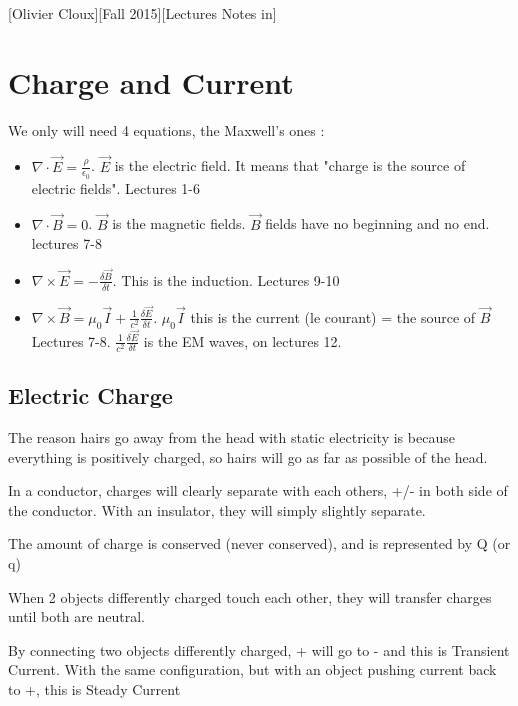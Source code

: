 \documentclass[12pt,a4paper]{article}
\begin{document}
[Olivier Cloux][Fall 2015][Lectures Notes in]
\tableofcontents
{}
\section{Charge and Current}
We only will need 4 equations, the Maxwell's ones :
\begin{itemize}
	\item 	$\nabla \cdot \vec{E} = \frac{\rho}{\epsilon_0}$. $\vec{E}$ is the electric field. It means that "charge is the source of electric fields". Lectures 1-6
	\item	$\nabla \cdot \vec{B} = 0$. $\vec{B}$ is the magnetic fields. $\vec{B}$ fields have no beginning and no end. lectures 7-8
	\item $\nabla \times \vec{E} = -\frac{\delta \vec{B}}{\delta t}$. This is the induction. Lectures 9-10
	\item $\nabla \times \vec{B} = \mu_0 \vec{I} + \frac{1}{c^2}\frac{\delta\vec{E}}{\delta t}$. $\mu_0 \vec{I}$ this is the current (le courant) = the source of $\vec{B}$ Lectures 7-8. $\frac{1}{c^2}\frac{\delta\vec{E}}{\delta t}$ is the EM waves, on lectures 12.
\end{itemize}
\subsection{Electric Charge}
The reason hairs go away from the head with static electricity is because everything is positively charged, so hairs will go as far as possible of the head.

In a conductor, charges will clearly separate with each others, +/- in both side of the conductor. With an insulator, they will simply slightly separate.
\begin{boite}
	 The amount of charge is conserved (never conserved), and is represented by Q (or q)
\end{boite}
When 2 objects differently charged touch each other, they will transfer charges until both are neutral.

By connecting two objects differently charged, + will go to - and this is Transient Current. With the same configuration, but with an object pushing current back to +, this is Steady Current
\end{document}
